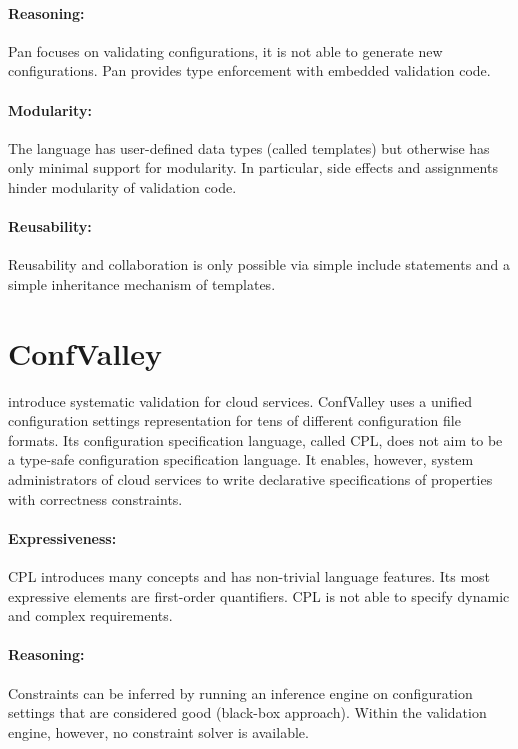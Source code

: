 \paragraph*{Reasoning:}
Pan focuses on validating configurations, it is not able to generate new configurations.
Pan provides type enforcement with embedded validation code.

\paragraph*{Modularity:}
The language has user-defined data types (called templates) but otherwise has only minimal support for modularity.
In particular, side effects and assignments hinder modularity of validation code.

\paragraph*{Reusability:}
Reusability and collaboration is only possible via simple include statements and a simple inheritance mechanism of templates.





\section{ConfValley}

\citet{huang2015confvalley} introduce systematic validation for cloud services.
ConfValley uses a unified configuration settings representation for tens of different configuration file formats.
Its configuration specification language, called CPL, does not aim to be a type-safe configuration specification language.
It enables, however, system administrators of cloud services to write declarative specifications of properties with correctness constraints.

\paragraph*{Expressiveness:}
CPL introduces many concepts and has non-trivial language features.
Its most expressive elements are first-order quantifiers.
CPL is not able to specify dynamic and complex requirements.

\paragraph*{Reasoning:}
Constraints can be inferred by running an inference engine on configuration settings that are considered good (black-box approach).
Within the validation engine, however, no constraint solver is available.

